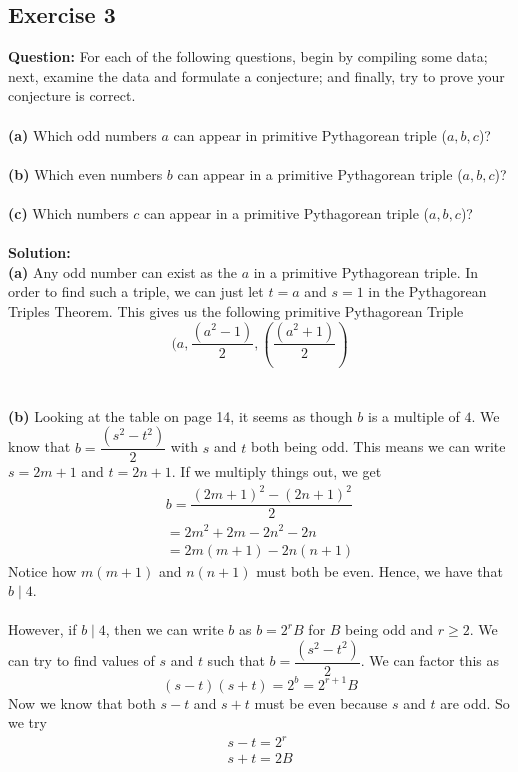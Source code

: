 \documentclass{article}
\begin{document}
\subsection{Exercise 3}
\textbf{Question:} For each of the following questions, begin by compiling some data; next, examine the data and formulate a conjecture; and finally, try to prove your conjecture is correct.\\
\\\textbf{(a)} Which odd numbers $a$ can appear in primitive Pythagorean triple ($a,b,c$)?\\
\\\textbf{(b)} Which even numbers $b$ can appear in a primitive Pythagorean triple ($a,b,c$)?\\
\\\textbf{(c)} Which numbers $c$ can appear in a primitive Pythagorean triple ($a,b,c$)?\\
\\\textbf{Solution:}\\
\textbf{(a)} Any odd number can exist as the $a$ in a primitive Pythagorean triple. In order to find such a triple, we can just let $t = a$ and $s = 1$ in the Pythagorean Triples Theorem. This gives us the following primitive Pythagorean Triple $$(a,\dfrac{(a^{2}-1)}{2},(\dfrac{(a^{2}+1)}{2})$$ \\
\\\textbf{(b)} Looking at the table on page 14, it seems as though $b$ is a multiple of $4$. We know that $b = \dfrac{(s^{2}-t^{2})}{2}$ with $s$ and $t$ both being odd. This means we can write $s = 2m+1$ and $t = 2n+1$. If we multiply things out, we get 
\begin{equation*}
\begin{split}
b = \dfrac{(2m+1)^{2}-(2n+1)^{2}}{2}
\\ = 2m^{2}+2m-2n^{2}-2n
\\ = 2m(m+1)-2n(n+1)
\end{split}
\end{equation*}
Notice how $m(m+1)$ and $n(n+1)$ must both be even. Hence, we have that $b\mid 4$.\\
\\ However, if $b\mid 4$, then we can write $b$ as $b = 2^{r}B$ for $B$ being odd and $r\geq 2$. We can try to find values of $s$ and $t$ such that $b = \dfrac{(s^{2}-t^{2})}{2}$. We can factor this as $$(s-t)(s+t)=2^{b}=2^{r+1}B$$
Now we know that both $s-t$ and $s+t$ must be even because $s$ and $t$ are odd. So we try
\begin{equation*}
\begin{split}
s-t=2^{r}
\\ s+t=2B
\end{split}
\end{equation*}
\end{document}
